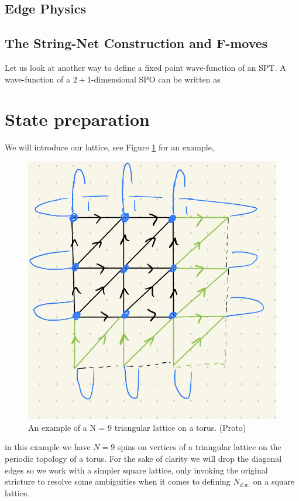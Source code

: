 \documentclass[a4paper,twocolumn,11pt]{quantumarticle}
\begin{document}
\subsection{Edge Physics}

\subsection{The String-Net Construction and F-moves}

Let us look at another way to define a fixed point wave-function of an SPT.
A wave-function of a $2+1$-dimensional SPO can be written as 
\section{State preparation}

We will introduce our lattice, see Figure \ref{fig:3x3pbc} for an example,
\begin{figure}
\centering
\includegraphics[width=\linewidth]{Figures/3x3_pbc.png}
\caption{An example of a N = 9 triangular lattice on a torus. (Proto)}
\label{fig:3x3pbc}
\end{figure}
in this example we have $N = 9$ spins on vertices of a triangular lattice on the periodic topology of a torus. For the sake of clarity we will drop the diagonal edges so we work with a simpler square lattice, only invoking the original stricture to resolve some ambiguities when it comes to defining $N_{d.w.}$ on a square lattice.
\end{document}
